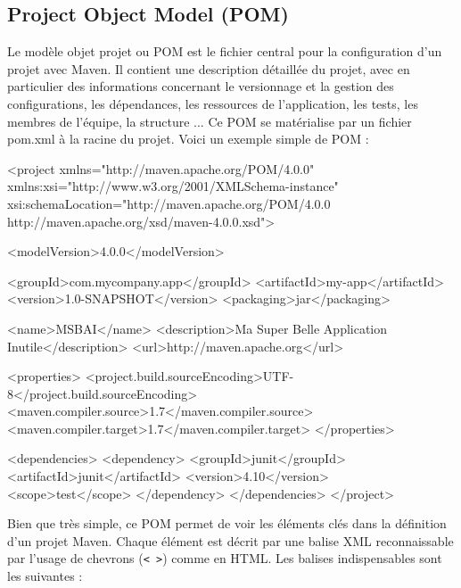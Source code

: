 \documentclass[a4paper,11pt]{article}
\begin{document}
\subsection{Project Object Model (POM)}
Le modèle objet projet ou POM est le fichier central pour la configuration d'un projet avec Maven. Il contient une 
description détaillée du projet, avec en particulier des informations concernant le versionnage et la gestion des configurations, 
les dépendances, les ressources de l'application, les tests, les membres de l'équipe, la structure ...
Ce POM se matérialise par un fichier pom.xml à la racine du projet. Voici un exemple simple de POM :
\begin{code_xml}
<project xmlns="http://maven.apache.org/POM/4.0.0" 
         xmlns:xsi="http://www.w3.org/2001/XMLSchema-instance"
         xsi:schemaLocation="http://maven.apache.org/POM/4.0.0 http://maven.apache.org/xsd/maven-4.0.0.xsd">
         
  <modelVersion>4.0.0</modelVersion>

  <groupId>com.mycompany.app</groupId>
  <artifactId>my-app</artifactId>
  <version>1.0-SNAPSHOT</version>
  <packaging>jar</packaging>

  <name>MSBAI</name>
  <description>Ma Super Belle Application Inutile</description>
  <url>http://maven.apache.org</url>

  <properties>
    <project.build.sourceEncoding>UTF-8</project.build.sourceEncoding>
    <maven.compiler.source>1.7</maven.compiler.source>
    <maven.compiler.target>1.7</maven.compiler.target>
  </properties>

  <dependencies>
    <dependency>
      <groupId>junit</groupId>
      <artifactId>junit</artifactId>
      <version>4.10</version>
      <scope>test</scope>
    </dependency>
  </dependencies>
</project>
\end{code_xml}
Bien que très simple, ce POM permet de voir les éléments clés dans la définition d'un projet Maven. Chaque élément est 
décrit par une balise XML reconnaissable par l'usage de chevrons (\texttt{< >}) comme en HTML. 
Les balises indispensables sont les suivantes :
\end{document}
